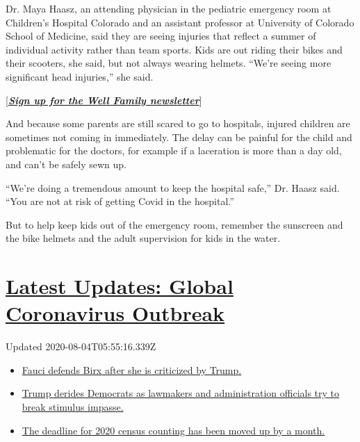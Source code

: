 Dr. Maya Haasz, an attending physician in the pediatric emergency room
at Children's Hospital Colorado and an assistant professor at University
of Colorado School of Medicine, said they are seeing injuries that
reflect a summer of individual activity rather than team sports. Kids
are out riding their bikes and their scooters, she said, but not always
wearing helmets. ``We're seeing more significant head injuries,'' she
said.

{[}\textbf{\href{https://www.nytimes.com/newsletters/well-family}{\emph{Sign
up for the Well Family newsletter}}}{]}

And because some parents are still scared to go to hospitals, injured
children are sometimes not coming in immediately. The delay can be
painful for the child and problematic for the doctors, for example if a
laceration is more than a day old, and can't be safely sewn up.

``We're doing a tremendous amount to keep the hospital safe,'' Dr. Haasz
said. ``You are not at risk of getting Covid in the hospital.''

But to help keep kids out of the emergency room, remember the sunscreen
and the bike helmets and the adult supervision for kids in the water.

\hypertarget{latest-updates-global-coronavirus-outbreak}{%
\section{\texorpdfstring{\href{https://www.nytimes.com/2020/08/03/world/coronavirus-covid-19.html?action=click\&pgtype=Article\&state=default\&region=MAIN_CONTENT_1\&context=storylines_live_updates}{Latest
Updates: Global Coronavirus
Outbreak}}{Latest Updates: Global Coronavirus Outbreak}}\label{latest-updates-global-coronavirus-outbreak}}

Updated 2020-08-04T05:55:16.339Z

\begin{itemize}
\tightlist
\item
  \href{https://www.nytimes.com/2020/08/03/world/coronavirus-covid-19.html?action=click\&pgtype=Article\&state=default\&region=MAIN_CONTENT_1\&context=storylines_live_updates\#link-4547638f}{Fauci
  defends Birx after she is criticized by Trump.}
\item
  \href{https://www.nytimes.com/2020/08/03/world/coronavirus-covid-19.html?action=click\&pgtype=Article\&state=default\&region=MAIN_CONTENT_1\&context=storylines_live_updates\#link-15e7f995}{Trump
  derides Democrats as lawmakers and administration officials try to
  break stimulus impasse.}
\item
  \href{https://www.nytimes.com/2020/08/03/world/coronavirus-covid-19.html?action=click\&pgtype=Article\&state=default\&region=MAIN_CONTENT_1\&context=storylines_live_updates\#link-e5a2cda}{The
  deadline for 2020 census counting has been moved up by a month.}
\end{itemize}


